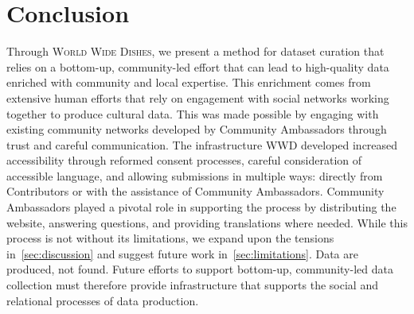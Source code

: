\section{Conclusion}\label{conclusion}


Through \textsc{World Wide Dishes}, we present a method for dataset curation that relies on a bottom-up, community-led effort that can lead to high-quality data enriched with community and local expertise. This enrichment comes from extensive human efforts that rely on engagement with social networks working together to produce cultural data. This was made possible by engaging with existing community networks developed by Community Ambassadors through trust and careful communication. The infrastructure \textsc{WWD} developed increased accessibility through reformed consent processes, careful consideration of accessible language, and allowing submissions in multiple ways: directly from Contributors or with the assistance of Community Ambassadors. Community Ambassadors played a pivotal role in supporting the process by distributing the website, answering questions, and providing translations where needed. While this process is not without its limitations, we expand upon the tensions in~\cref{sec:discussion} and suggest future work in~\cref{sec:limitations}. Data are produced, not found. Future efforts to support bottom-up, community-led data collection must therefore provide infrastructure that supports the social and relational processes of data production. 






